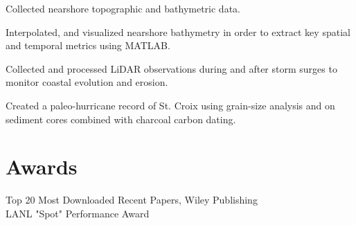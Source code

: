 \documentclass[]{deedy-resume-openfont}
\begin{document}
\begin{minipage}[t]{0.60\textwidth}
\begin{tightemize}
	\item Collected nearshore topographic and bathymetric data.
	\item Interpolated, and visualized nearshore bathymetry in order to extract key spatial and temporal metrics using MATLAB.
\end{tightemize}
\sectionsep

\begin{tightemize}
	\item Collected and processed LiDAR observations during and after storm surges to monitor coastal evolution and erosion.
	\item Created a paleo-hurricane record of St. Croix using grain-size analysis and on sediment cores combined with charcoal carbon dating.
\end{tightemize}
\sectionsep



\section{Awards}
Top 20 Most Downloaded Recent Papers, Wiley Publishing\\
LANL "Spot" Performance Award


	
\end{minipage}
\end{document}
